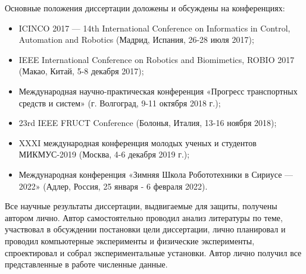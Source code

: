 {\probation}
Основные положения диссертации доложены и обсуждены на конференциях:
\begin{itemize}
  \item ICINCO 2017 — 14th International Conference on Informatics in Control, Automation and Robotics (Мадрид, Испания, 26-28 июля 2017);
  \item IEEE International Conference on Robotics and Biomimetics, ROBIO 2017 (Макао, Китай, 5-8 декабря 2017);
  \item  Международная научно-практическая конференция «Прогресс транспортных средств и систем» (г. Волгоград, 9-11 октября 2018 г.);
  \item 23rd IEEE FRUCT Conference (Болонья, Италия, 13-16 ноября 2018);
  \item XXXI международная конференция молодых ученых и студентов МИКМУС-2019 (Москва, 4-6 декабря 2019 г.);
  \item Международная конференция «Зимняя Школа Робототехники в Сириусе — 2022» (Адлер, Россия, 25 января - 6 февраля 2022).
\end{itemize}

{\contribution} Все научные результаты диссертации, выдвигаемые для защиты, получены автором лично. Автор самостоятельно проводил анализ литературы по теме, участвовал в обсуждении постановки цели диссертации, лично планировал и проводил компьютерные эксперименты и физические эксперименты, спроектировал и собрал экспериментальные установки. Автор лично получил все представленные в работе численные данные. 

